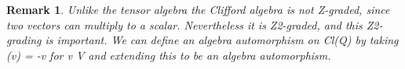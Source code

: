\documentclass[aps, preprint]{revtex4}
\newtheorem{remark}[theorem]{Remark}
\begin{document}
\begin{remark}
Unlike the tensor algebra the Clifford algebra is not Z-graded, since two vectors can multiply to a scalar. Nevertheless it is Z2-graded,
and this Z2-grading is important. We can define an algebra automorphism {\small{}}  on Cl(Q) by taking {\small{}} (v) = -v for v {\small{}}  V and extending this to
be an algebra automorphism. 
\end{remark}
\end{document}
